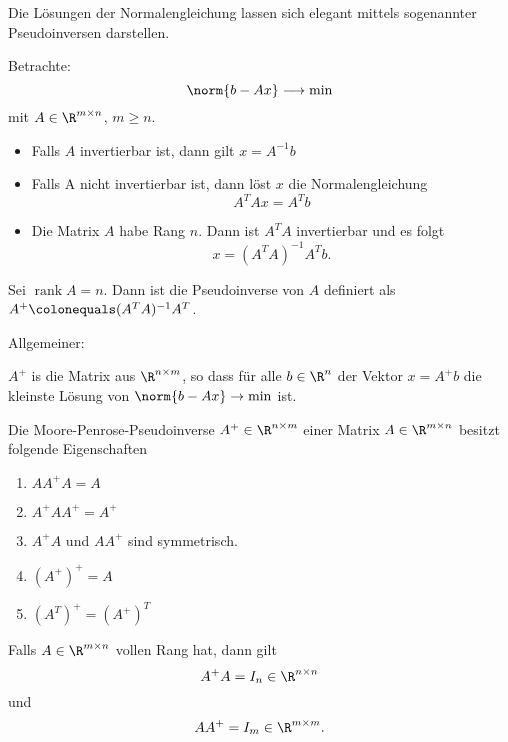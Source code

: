 Die Lösungen der Normalengleichung lassen sich elegant mittels sogenannter Pseudoinversen darstellen.

Betrachte:
\begin{equation*}
 \norm{b-Ax} \longrightarrow \min
\end{equation*}
mit $A\in \R^{m \times n}$, $m \geq n$.
\begin{itemize}
    \item Falls $A$ invertierbar ist, dann gilt $x=A^{-1}b$
    \item Falls A nicht invertierbar ist, dann löst $x$ die Normalengleichung
    \begin{equation*}
     A^TAx = A^Tb
    \end{equation*}
    \item Die Matrix $A$ habe Rang $n$. Dann ist $A^TA$ invertierbar und es folgt
    \begin{equation*}
     x = (A^TA)^{-1}A^Tb.
    \end{equation*}
\end{itemize}

\begin{defi}[Pseudoinverse] Sei $\operatorname{rank} A = n$.  Dann ist die Pseudoinverse von $A$
  definiert als $A^+ \colonequals (A^TA)^{-1}A^T$.
\end{defi}

Allgemeiner:

\begin{defi}
 $A^+$ is die Matrix aus $\R^{n \times m}$, so dass für alle $b \in \R^n$ der Vektor $x = A^+b$
 die kleinste Lösung von $\norm{b-Ax} \to \min$ ist.
\end{defi}




\begin{satz}
Die Moore-Penrose-Pseudoinverse $A^+ \in \R^{n \times m}$ einer Matrix $A \in \R^{m \times n}$ besitzt folgende Eigenschaften
\begin{enumerate}
  \item $AA^+A=A$
  \item $A^+AA^+=A^+$
  \item $A^+A$ und $AA^+$ sind symmetrisch.
  \item $(A^+)^+=A$
  \item $(A^T)^+=(A^+)^T$
\end{enumerate}
Falls $A \in \R^{m \times n}$ vollen Rang hat, dann gilt
\begin{equation*}
  A^+A = I_n \in \R^{n \times n}
\end{equation*}
und
\begin{equation*}
  AA^+ = I_m \in \R^{m \times m}.
\end{equation*}
\end{satz}


